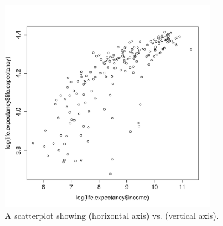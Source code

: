 \begin{doublespace}
\begin{figure}
\centering
\includegraphics[width=0.8\textwidth]
{ch_intro_to_data_oi_biostat/figures/logIncomeLifeExpectancy/logIncomeLifeExpectancy.pdf}
\caption{A scatterplot showing  (horizontal axis) vs.   (vertical axis).} 
\label{logIncomeLifeExpectancy}
\end{figure}

\end{doublespace}
